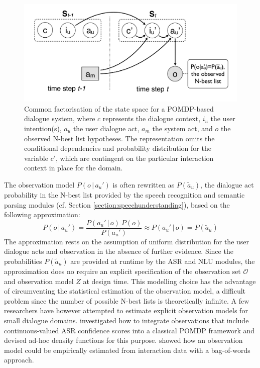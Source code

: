\begin{figure}[h]
\centering
\includegraphics[scale=0.30]{imgs/POMDP2.pdf}
\caption{Common factorisation of the state space for a POMDP-based dialogue system, where $c$ represents the dialogue context, $i_u$ the user intention(s), $a_u$ the user dialogue act, $a_m$ the system act, and $o$ the observed N-best list hypotheses. The representation omits the conditional dependencies and probability distribution for the variable $c'$, which are contingent on the particular interaction context in place for the domain.}
\label{fig:pomdp2}
\end{figure}

The observation model $P(o \, | \, a_u')$ is often rewritten as $P(\tilde{a}_u)$, the dialogue act probability in the N-best list provided by the speech recognition and semantic parsing modules (cf. Section \ref{section:speechunderstanding}), based on the following approximation:
\begin{equation}
P(o \, | \, a_u') = \frac{P(a_u' \, | \, o) \ P(o)} {P(a_u')} \approx P(a_u' \, | \, o) = P(\tilde{a}_u)
\end{equation}
The approximation rests on the assumption of uniform distribution for the user dialogue acts and observation in the absence of further evidence. Since the probabilities $P(\tilde{a}_u)$ are provided at runtime by the ASR and NLU modules, the approximation does no require an explicit specification of the observation set $\mathcal{O}$ and observation model $Z$ at design time.  This modelling choice has the advantage of circumventing the statistical estimation of the observation model, a difficult problem since the number of possible N-best lists is theoretically infinite. A few researchers have however attempted to estimate explicit observation models for small dialogue domains. \cite{Williamsetal:2008} investigated how to integrate observations that include continuous-valued ASR confidence scores into a classical POMDP framework and devised ad-hoc density functions for this purpose.  \cite{chinaei2012} showed how an observation model could be empirically estimated from interaction data with a bag-of-words approach. 

